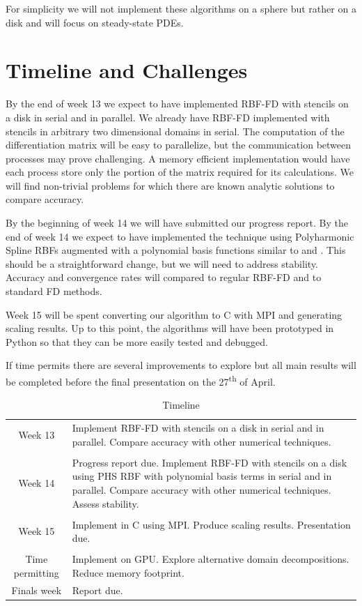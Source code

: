\documentclass[12pt]{article}
\begin{document}
	For simplicity we will not implement these algorithms on a sphere but rather on a disk and will focus on steady-state PDEs.
	
\section{Timeline and Challenges}
	By the end of week 13 we expect to have implemented RBF-FD with stencils on a disk in serial and in parallel. We already have RBF-FD implemented with stencils in arbitrary two dimensional domains in serial. The computation of the differentiation matrix will be easy to parallelize, but the communication between processes may prove challenging. A memory efficient implementation would have each process store only the portion of the matrix required for its calculations. We will find non-trivial problems for which there are known analytic solutions to compare accuracy.
	
	By the beginning of week 14 we will have submitted our progress report. By the end of week 14 we expect to have implemented the technique using Polyharmonic Spline RBFs augmented with a polynomial basis functions similar to \cite{Flyer2016-1} and \cite{Flyer2017-2}. This should be a straightforward change, but we will need to address stability. Accuracy and convergence rates will compared to regular RBF-FD and to standard FD methods.	
	
	Week 15 will be spent converting our algorithm to C with MPI and generating scaling results. Up to this point, the algorithms will have been prototyped in Python so that they can be more easily tested and debugged.
	
	If time permits there are several improvements to explore but all main results will be completed before the final presentation on the 27\textsuperscript{th} of April.
	
	\begin{table}
		\caption{Timeline}
		\begin{tabular}{ c| p{12cm}} 
			Week 13 & Implement RBF-FD with stencils on a disk in serial and in parallel. Compare accuracy with other numerical techniques.\\
			& \\
			Week 14 & Progress report due. Implement RBF-FD with stencils on a disk using PHS RBF with polynomial basis terms in serial and in parallel. Compare accuracy with other numerical techniques. Assess stability. \\
			&\\
			Week 15 & Implement in C using MPI. Produce scaling results. Presentation due.\\
			&\\
			Time permitting & Implement on GPU. Explore alternative domain decompositions. Reduce memory footprint.\\
			Finals week & Report due.
			
		\end{tabular}
		
	\end{table}
 
\pagebreak
 
\printbibliography
\end{document}
